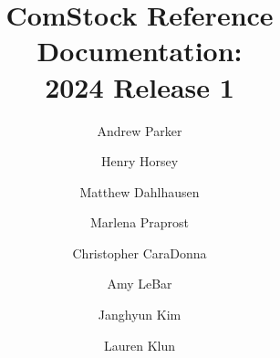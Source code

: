 \documentclass[]{nrel}
\title{ComStock Reference Documentation: \\ 2024 Release 1}
\author{Andrew Parker}
\author{Henry Horsey}
\author{Matthew Dahlhausen}
\author{Marlena Praprost}
\author{Christopher CaraDonna}
\author{Amy LeBar}
\author{Janghyun Kim}
\author{Lauren Klun}
\affil{National Renewable Energy Laboratory}
\begin{document}
\frontmatter





\mainmatter
\tableofcontents

\listoffigures

\listoftables




\label{chap:3_sampling}












\cleardoublepage
\label{sec:Bib}
\printbibliography[title={\LARGE References}]
\begin{appendices} %




\end{appendices}
\end{document}
